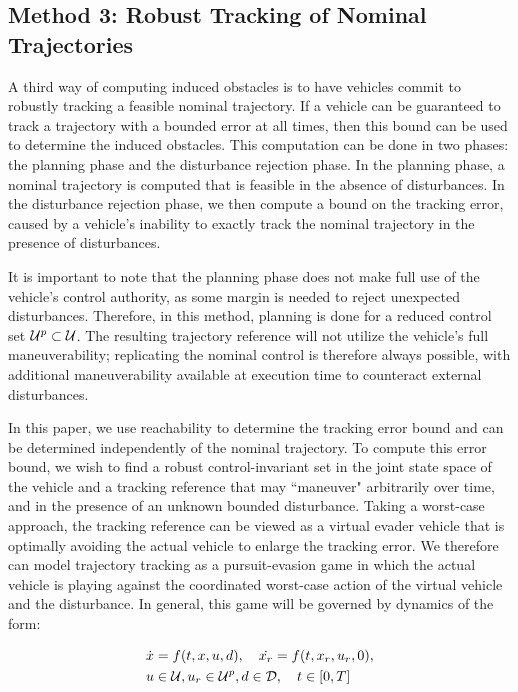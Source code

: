 \subsection{Method 3: Robust Tracking of Nominal Trajectories \label{sec:rtt}}
A third way of computing induced obstacles is to have vehicles commit to robustly tracking a feasible nominal trajectory. If a vehicle can be guaranteed to track a trajectory with a bounded error at all times, then this bound can be used to determine the induced obstacles. This computation can be done in two phases: the planning phase and the disturbance rejection phase. 
In the planning phase, a nominal trajectory is computed that is feasible in the absence of disturbances. In the disturbance rejection phase, we then compute a bound on the tracking error, caused by a vehicle's inability to exactly track the nominal trajectory in the presence of disturbances. 

It is important to note that the planning phase does not make full use of the vehicle's control authority, as some margin is needed to reject unexpected disturbances. Therefore, in this method, planning is done for a reduced control set $\mathcal{U}^p\subset\mathcal{U}$. The resulting trajectory reference will not utilize the vehicle's full maneuverability; replicating the nominal control is therefore always possible, with additional maneuverability available at execution time to counteract external disturbances.

In this paper, we use reachability to determine the tracking error bound and can be determined independently of the nominal trajectory. To compute this error bound, we wish to find a robust control-invariant set in the joint state space of the vehicle and a tracking reference that may ``maneuver" arbitrarily over time, and in the presence of an unknown bounded disturbance. Taking a worst-case approach, the tracking reference can be viewed as a virtual evader vehicle that is optimally avoiding the actual vehicle to enlarge the tracking error. We therefore can model trajectory tracking as a pursuit-evasion game in which the actual vehicle is playing against the coordinated worst-case action of the virtual vehicle and the disturbance. In general, this game will be governed by dynamics of the form:

\begin{equation}
\label{eq:jdyn} %
\begin{aligned}
\dot{x} &= f(t, x, u, d), \quad \dot{x_r} =f(t,x_r,u_r,0),\\
u &\in \cset, u_r\in\cset^p, d \in \dset, \quad t \in [0, T]
\end{aligned}
\end{equation}

